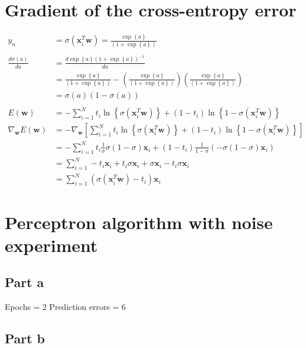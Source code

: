 \documentclass{article}
\newcommand{\diff}[2]{
        \frac{d #1}{d #2}
}
\begin{document}
\section{Gradient of the cross-entropy error}
\begin{align*}
y_n &= \sigma(\bm{x}_{i}^{T}\bm{w})=\frac{\exp\left\{ a \right\}}{\left( 1+\exp\left\{ a\right\} \right)}\\
&\nonumber\\
\diff{\sigma(a)}{a} &= \diff{\exp\left\{ a \right\} \left( 1+\exp\left\{ a\right\} \right)^{-1}}{a}\\
		    &= \frac{\exp\left\{ a \right\}}{\left( 1+\exp\left\{ a\right\} \right)} -
		       \left( 
			\frac{\exp\left\{ a \right\}}{\left( 1+\exp\left\{ a\right\} \right)}
		       \right)
		       \left(
			\frac{\exp\left\{ a \right\}}{\left( 1+\exp\left\{ a\right\} \right)}
		       \right)\\
		    &= \sigma(a)\left(1-\sigma(a)\right)\\
&\nonumber\\
E(\bm{w}) &= -\sum_{i=1}^N t_i \ln\left\{ \sigma(\bm{x}_{i}^{T} \bm{w}) \right\} + (1-t_i)\ln\left\{1-\sigma(\bm{x}_{i}^{T}\bm{w})\right\}\\
\nabla_{\bm{w}} E(\bm{w}) &= -\nabla_{\bm{w}}\left[\sum_{i=1}^N t_i \ln\left\{ \sigma(\bm{x}_{i}^{T}\bm{w}) \right\} + (1-t_i)\ln\left\{1-\sigma(\bm{x}_{i}^{T}\bm{w})\right\}\right]\\
&=-\sum_{i=1}^N t_i \frac{1}{\sigma} \sigma(1-\sigma)\bm{x}_{i} + (1-t_i) \frac{1}{1-\sigma} \left(-\sigma(1-\sigma)\bm{x}_{i}\right)\\
&=\sum_{i=1}^{N} -t_i \bm{x}_{i} + t_i \sigma \bm{x}_{i} + \sigma \bm{x}_{i} - t_i \sigma \bm{x}_{i}\\
&=\sum_{i=1}^{N} (\sigma(\bm{x}_{i}^{T}\bm{w}) - t_i)\bm{x}_{i}
\end{align*}
\section{Perceptron algorithm with noise experiment}

\subsection*{Part a}
Epochs = 2
Prediction errors = 6

\subsection*{Part b}
\end{document}
